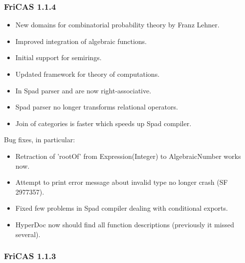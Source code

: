 \subsubsection{FriCAS 1.1.4}

\begin{itemize}
\item New domains for combinatorial probability theory by Franz
  Lehner.

\item Improved integration of algebraic functions.

\item Initial support for semirings.

\item Updated framework for theory of computations.

\item In Spad parser  and \spad{->} are now
  right-associative.

\item Spad parser no longer transforms relational operators.

\item Join of categories is faster which speeds up Spad compiler.
\end{itemize}

Bug fixes, in particular:

\begin{itemize}
\item Retraction of 'rootOf' from Expression(Integer) to
  AlgebraicNumber works now.

\item Attempt to print error message about invalid type no longer
  crash (SF 2977357).

\item Fixed few problems in Spad compiler dealing with conditional
  exports.

\item HyperDoc now should find all function descriptions (previously
  it missed several).
\end{itemize}

\subsubsection{FriCAS 1.1.3}

